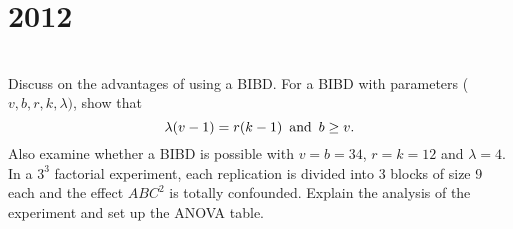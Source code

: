 \section*{2012}
\vspace{-.5cm}
\hrulefill \smallskip\\
 Discuss on the advantages of using a BIBD. For a BIBD with parameters ($v,b,r,k, \lambda)$, show that \[ \lambda(v-1) = r(k - 1) \enskip \text{and} \enskip b\geq v .\] Also examine whether a BIBD is possible with $v =b =34$, $ r=k=12$ and $\lambda = 4$.
\myline
{} In a $3^3$ factorial experiment, each replication is divided into 3 blocks of size 9 each and the effect $ABC^2$ is totally confounded. Explain the analysis of the experiment and set up the ANOVA table. 